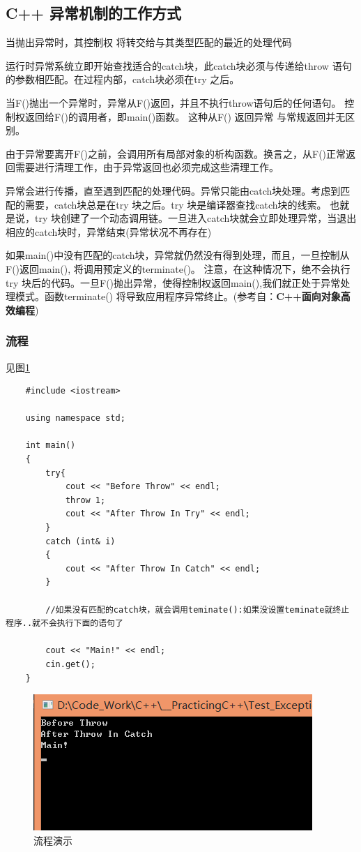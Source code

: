 \documentclass[UTF8,a4paper,12pt]{ctexbook}
\begin{document}
		\subsection{C++ 异常机制的工作方式}
			当抛出异常时，其控制权 将转交给与其类型匹配的最近的处理代码
			
			运行时异常系统立即开始查找适合的catch块，此catch块必须与传递给throw 语句的参数相匹配。在过程内部，catch块必须在try 之后。
			
			当F()抛出一个异常时，异常从F()返回，并且不执行throw语句后的任何语句。 控制权返回给F()的调用者，即main()函数。 这种从F() 返回异常 与常规返回并无区别。 
			
			由于异常要离开F()之前，会调用所有局部对象的析构函数。换言之，从F()正常返回需要进行清理工作，由于异常返回也必须完成这些清理工作。
			
			异常会进行传播，直至遇到匹配的处理代码。异常只能由catch块处理。考虑到匹配的需要，catch块总是在try 块之后。try 块是编译器查找catch块的线索。 也就是说，try 块创建了一个动态调用链。一旦进入catch块就会立即处理异常，当退出相应的catch块时，异常结束(异常状况不再存在)
			
			如果main()中没有匹配的catch块，异常就仍然没有得到处理，而且，一旦控制从F()返回main(), 将调用预定义的terminate()。 注意，在这种情况下，绝不会执行try 块后的代码。一旦F()抛出异常，使得控制权返回main(),我们就正处于异常处理模式。函数terminate() 将导致应用程序异常终止。(参考自：\textbf{C++面向对象高效编程})
			
			\subsubsection{流程}见图\ref{process_error}
\begin{lstlisting}
	#include <iostream>
	
	using namespace std;
	
	int main()
	{
		try{
			cout << "Before Throw" << endl;
			throw 1;
			cout << "After Throw In Try" << endl;
		}
		catch (int& i)
		{
			cout << "After Throw In Catch" << endl;
		}
		
		//如果没有匹配的catch块，就会调用teminate():如果没设置teminate就终止程序..就不会执行下面的语句了
		
		cout << "Main!" << endl;
		cin.get();
	}
\end{lstlisting}
			
			\begin{figure}[h]
				\centering
				\includegraphics[scale = 1]{Exception_Process.png}
				\caption{流程演示}
				\label{process_error}
			\end{figure}
			
\end{document}
